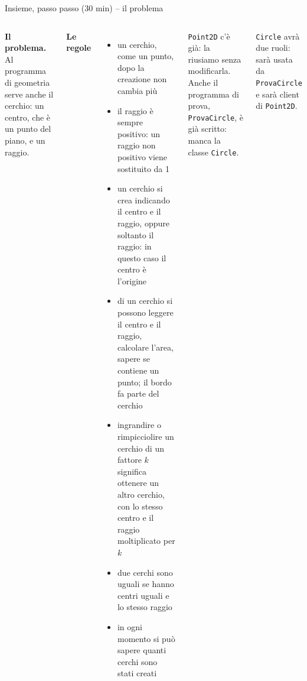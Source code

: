\documentclass[10pt,aspectratio=169]{beamer}
\begin{document}
\begin{frame}[fragile]{Insieme, passo passo (30 min) -- il problema}
\begin{columns}[T]
\small
\textbf{Il problema.} Al programma di geometria serve anche il cerchio: un centro, che è un punto del piano, e un raggio.

\vspace{0.1cm}
\textbf{Le regole}
\begin{itemize}\itemsep=2pt
    \item un cerchio, come un punto, dopo la creazione non cambia più
    \item il raggio è sempre positivo: un raggio non positivo viene sostituito da 1
    \item un cerchio si crea indicando il centro e il raggio, oppure soltanto il raggio: in questo caso il centro è l'origine
    \item di un cerchio si possono leggere il centro e il raggio, calcolare l'area, sapere se contiene un punto; il bordo fa parte del cerchio
    \item ingrandire o rimpicciolire un cerchio di un fattore $k$ significa ottenere un altro cerchio, con lo stesso centro e il raggio moltiplicato per $k$
    \item due cerchi sono uguali se hanno centri uguali e lo stesso raggio
    \item in ogni momento si può sapere quanti cerchi sono stati creati
\end{itemize}

\vspace{0.1cm}
\texttt{Point2D} c'è già: la riusiamo senza modificarla. Anche il programma di prova, \texttt{ProvaCircle}, è già scritto: manca la classe \texttt{Circle}.

\footnotesize
\texttt{Circle} avrà due ruoli: sarà usata da \texttt{ProvaCircle} e sarà client di \texttt{Point2D}.
\end{columns}
\end{frame}
\end{document}
